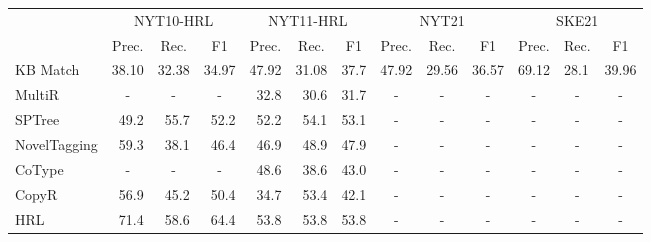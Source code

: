 \documentclass[11pt,a4paper]{article}
\begin{document}
\begin{table*}[ht!]
  \centering
  \small
  \addtolength{\tabcolsep}{-2.5pt}
    \begin{tabular}{p{4.2cm}rrrrrrrrrlll}
    \toprule
             & \multicolumn{3}{c}{NYT10-HRL}  & \multicolumn{3}{c}{NYT11-HRL}  & \multicolumn{3}{c}{NYT21}      & \multicolumn{3}{c}{SKE21} \\
\cmidrule{2-13}             & \multicolumn{1}{c}{Prec.} & \multicolumn{1}{c}{Rec.} & \multicolumn{1}{c}{F1} & \multicolumn{1}{c}{Prec.} & \multicolumn{1}{c}{Rec.} & \multicolumn{1}{c}{F1} & \multicolumn{1}{c}{Prec.} & \multicolumn{1}{c}{Rec.} & \multicolumn{1}{c}{F1} & \multicolumn{1}{c}{Prec.} & \multicolumn{1}{c}{Rec.} & \multicolumn{1}{c}{F1} \\
    \midrule
    KB Match & 38.10       & 32.38    & 34.97    & 47.92    & 31.08    & 37.7     & 47.92    & 29.56    & 36.57    & 69.12    & 28.1     & 39.96 \\
    MultiR \cite{Hoffmann2011KnowledgeBasedWS} & \multicolumn{1}{c}{-} & \multicolumn{1}{c}{-} & \multicolumn{1}{c}{-} & 32.8     & 30.6     & 31.7     & \multicolumn{1}{c}{-} & \multicolumn{1}{c}{-} & \multicolumn{1}{c}{-} & \multicolumn{1}{c}{-} & \multicolumn{1}{c}{-} & \multicolumn{1}{c}{-} \\
    SPTree \cite{Miwa2016EndtoEndRE} & 49.2     & 55.7     & 52.2     & 52.2     & 54.1     & 53.1     & \multicolumn{1}{c}{-} & \multicolumn{1}{c}{-} & \multicolumn{1}{c}{-} & \multicolumn{1}{c}{-} & \multicolumn{1}{c}{-} & \multicolumn{1}{c}{-} \\
    NovelTagging \cite{Zheng2017JointEO} & 59.3     & 38.1     & 46.4     & 46.9     & 48.9     & 47.9     & \multicolumn{1}{c}{-} & \multicolumn{1}{c}{-} & \multicolumn{1}{c}{-} & \multicolumn{1}{c}{-} & \multicolumn{1}{c}{-} & \multicolumn{1}{c}{-} \\
    CoType \cite{Ren2017CoTypeJE} & \multicolumn{1}{c}{-} & \multicolumn{1}{c}{-} & \multicolumn{1}{c}{-} & 48.6     & 38.6     & 43.0       & \multicolumn{1}{c}{-} & \multicolumn{1}{c}{-} & \multicolumn{1}{c}{-} & \multicolumn{1}{c}{-} & \multicolumn{1}{c}{-} & \multicolumn{1}{c}{-} \\
    CopyR \cite{Zeng2018ExtractingRF} & 56.9     & 45.2     & 50.4     & 34.7     & 53.4     & 42.1     & \multicolumn{1}{c}{-} & \multicolumn{1}{c}{-} & \multicolumn{1}{c}{-} & \multicolumn{1}{c}{-} & \multicolumn{1}{c}{-} & \multicolumn{1}{c}{-} \\
    HRL \cite{Takanobu2019AHF} & 71.4     & 58.6     & 64.4     & 53.8     & 53.8     & 53.8     & \multicolumn{1}{c}{-} & \multicolumn{1}{c}{-} & \multicolumn{1}{c}{-} & \multicolumn{1}{c}{-} & \multicolumn{1}{c}{-} & \multicolumn{1}{c}{-} \\

\end{tabular}
\end{table*}
\end{document}
